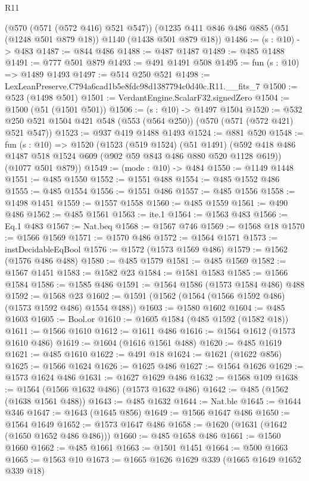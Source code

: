 \begin{lexlean}{R11}
\begin{coremodule}
    (@570 (@571 (@572 @416) @521 @547))
    (@1235 @411 @846 @486 @885 (@51 (@1248 @501 @879 @18)) @1140 (@1438 @501 @879 @18))
@1486 := (s : @10) -> @483
@1487 := @844 @486
@1488 := @487 @1487
@1489 := @485 @1488
@1491 := @777 @501 @879
@1493 := @491 @1491 @508
@1495 := fun (s : @10) => @1489 @1493
@1497 := @514 @250 @521
@1498 := LexLeanPreserve.C794a6cad1b5e8fdc98d1387794c0d40c.R11.__fits_7
@1500 := @523 (@1498 @501)
@1501 := VerdantEngine.ScalarF32.signedZero
@1504 := @1500 (@51 (@1501 @501))
@1506 := (s : @10) -> @1497 @1504
@1520 := @532 @250 @521 @1504 @421 @548 (@553 (@564 @250)) (@570 (@571 (@572 @421) @521 @547))
@1523 := @937 @419 @1488 @1493
@1524 := @881 @520
@1548 := fun (s : @10) =>
  @1520
    (@1523
      (@519 @1524)
      (@51 @1491)
      (@592 @418 @486 @1487 @518 @1524 @609 (@902 @59 @843 @486 @880 @520 @1128 @619))
      (@1077 @501 @879))
@1549 := (mode : @10) -> @484
@1550 := @1149 @1448
@1551 := @485 @1550
@1552 := @1551 @488
@1554 := @485 @1552 @486
@1555 := @485 @1554
@1556 := @1551 @486
@1557 := @485 @1556
@1558 := @1498 @1451
@1559 := @1557 @1558
@1560 := @485 @1559
@1561 := @490 @486
@1562 := @485 @1561
@1563 := ite.{1}
@1564 := @1563 @483
@1566 := Eq.{1} @483
@1567 := Nat.beq
@1568 := @1567 @746
@1569 := @1568 @18
@1570 := @1566 @1569
@1571 := @1570 @486
@1572 := @1564 @1571
@1573 := instDecidableEqBool
@1576 := @1572 (@1573 @1569 @486)
@1579 := @1562 (@1576 @486 @488)
@1580 := @485 @1579
@1581 := @485 @1569
@1582 := @1567 @1451
@1583 := @1582 @23
@1584 := @1581 @1583
@1585 := @1566 @1584
@1586 := @1585 @486
@1591 := @1564 @1586 (@1573 @1584 @486) @488
@1592 := @1568 @23
@1602 := @1591 (@1562 (@1564 (@1566 @1592 @486) (@1573 @1592 @486) @1554 @488))
@1603 := @1580 @1602
@1604 := @485 @1603
@1605 := Bool.or
@1610 := @1605 @1584 (@485 @1592 (@1582 @18))
@1611 := @1566 @1610
@1612 := @1611 @486
@1616 := @1564 @1612 (@1573 @1610 @486)
@1619 := @1604 (@1616 @1561 @488)
@1620 := @485 @1619
@1621 := @485 @1610
@1622 := @491 @18
@1624 := @1621 (@1622 @856)
@1625 := @1566 @1624
@1626 := @1625 @486
@1627 := @1564 @1626
@1629 := @1573 @1624 @486
@1631 := @1627 @1629 @486
@1632 := @1568 @109
@1638 := @1564 (@1566 @1632 @486) (@1573 @1632 @486)
@1642 := @485 (@1562 (@1638 @1561 @488))
@1643 := @485 @1632
@1644 := Nat.ble
@1645 := @1644 @346
@1647 := @1643 (@1645 @856)
@1649 := @1566 @1647 @486
@1650 := @1564 @1649
@1652 := @1573 @1647 @486
@1658 := @1620 (@1631 (@1642 (@1650 @1652 @486 @486)))
@1660 := @485 @1658 @486
@1661 := @1560 @1660
@1662 := @485 @1661
@1663 := @1501 @1451
@1664 := @500 @1663
@1665 := @1563 @10
@1673 := @1665 @1626 @1629 @339 (@1665 @1649 @1652 @339 @18)

\end{coremodule}
\end{lexlean}
